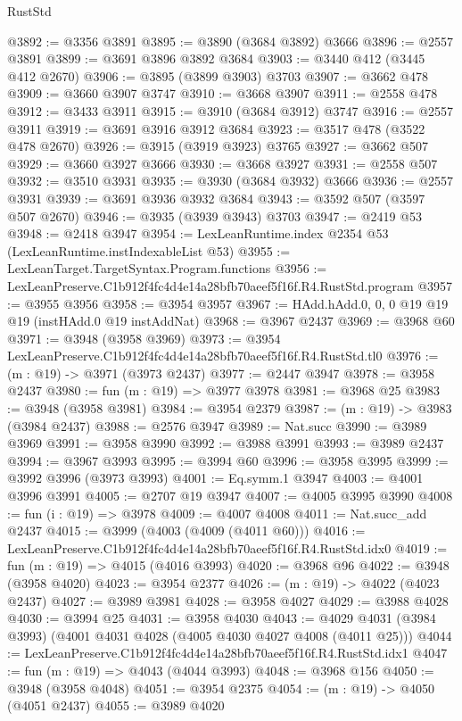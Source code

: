 \begin{lexlean}{RustStd}
\begin{coremodule}
@3892 := @3356 @3891
@3895 := @3890 (@3684 @3892) @3666
@3896 := @2557 @3891
@3899 := @3691 @3896 @3892 @3684
@3903 := @3440 @412 (@3445 @412 @2670)
@3906 := @3895 (@3899 @3903) @3703
@3907 := @3662 @478
@3909 := @3660 @3907 @3747
@3910 := @3668 @3907
@3911 := @2558 @478
@3912 := @3433 @3911
@3915 := @3910 (@3684 @3912) @3747
@3916 := @2557 @3911
@3919 := @3691 @3916 @3912 @3684
@3923 := @3517 @478 (@3522 @478 @2670)
@3926 := @3915 (@3919 @3923) @3765
@3927 := @3662 @507
@3929 := @3660 @3927 @3666
@3930 := @3668 @3927
@3931 := @2558 @507
@3932 := @3510 @3931
@3935 := @3930 (@3684 @3932) @3666
@3936 := @2557 @3931
@3939 := @3691 @3936 @3932 @3684
@3943 := @3592 @507 (@3597 @507 @2670)
@3946 := @3935 (@3939 @3943) @3703
@3947 := @2419 @53
@3948 := @2418 @3947
@3954 := LexLeanRuntime.index @2354 @53 (LexLeanRuntime.instIndexableList @53)
@3955 := LexLeanTarget.TargetSyntax.Program.functions
@3956 := LexLeanPreserve.C1b912f4fc4d4e14a28bfb70aeef5f16f.R4.RustStd.program
@3957 := @3955 @3956
@3958 := @3954 @3957
@3967 := HAdd.hAdd.{0, 0, 0} @19 @19 @19 (instHAdd.{0} @19 instAddNat)
@3968 := @3967 @2437
@3969 := @3968 @60
@3971 := @3948 (@3958 @3969)
@3973 := @3954 LexLeanPreserve.C1b912f4fc4d4e14a28bfb70aeef5f16f.R4.RustStd.tl0
@3976 := (m : @19) -> @3971 (@3973 @2437)
@3977 := @2447 @3947
@3978 := @3958 @2437
@3980 := fun (m : @19) => @3977 @3978
@3981 := @3968 @25
@3983 := @3948 (@3958 @3981)
@3984 := @3954 @2379
@3987 := (m : @19) -> @3983 (@3984 @2437)
@3988 := @2576 @3947
@3989 := Nat.succ
@3990 := @3989 @3969
@3991 := @3958 @3990
@3992 := @3988 @3991
@3993 := @3989 @2437
@3994 := @3967 @3993
@3995 := @3994 @60
@3996 := @3958 @3995
@3999 := @3992 @3996 (@3973 @3993)
@4001 := Eq.symm.{1} @3947
@4003 := @4001 @3996 @3991
@4005 := @2707 @19 @3947
@4007 := @4005 @3995 @3990
@4008 := fun (i : @19) => @3978
@4009 := @4007 @4008
@4011 := Nat.succ_add @2437
@4015 := @3999 (@4003 (@4009 (@4011 @60)))
@4016 := LexLeanPreserve.C1b912f4fc4d4e14a28bfb70aeef5f16f.R4.RustStd.idx0
@4019 := fun (m : @19) => @4015 (@4016 @3993)
@4020 := @3968 @96
@4022 := @3948 (@3958 @4020)
@4023 := @3954 @2377
@4026 := (m : @19) -> @4022 (@4023 @2437)
@4027 := @3989 @3981
@4028 := @3958 @4027
@4029 := @3988 @4028
@4030 := @3994 @25
@4031 := @3958 @4030
@4043 := @4029 @4031 (@3984 @3993) (@4001 @4031 @4028 (@4005 @4030 @4027 @4008 (@4011 @25)))
@4044 := LexLeanPreserve.C1b912f4fc4d4e14a28bfb70aeef5f16f.R4.RustStd.idx1
@4047 := fun (m : @19) => @4043 (@4044 @3993)
@4048 := @3968 @156
@4050 := @3948 (@3958 @4048)
@4051 := @3954 @2375
@4054 := (m : @19) -> @4050 (@4051 @2437)
@4055 := @3989 @4020

\end{coremodule}
\end{lexlean}

